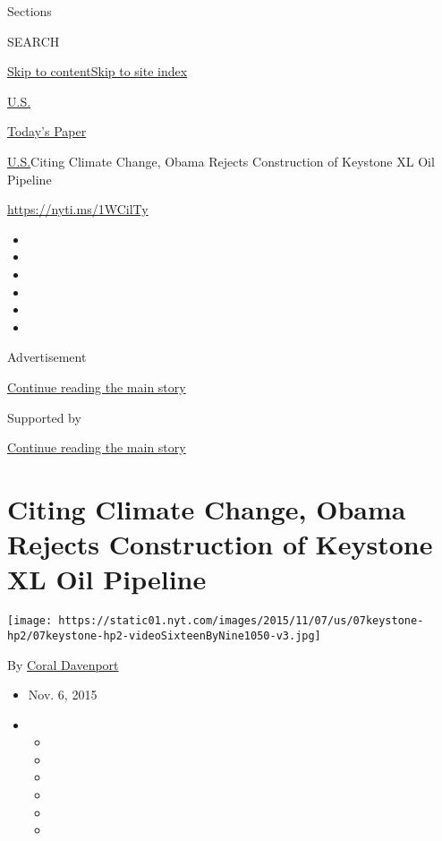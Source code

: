 Sections

SEARCH

\protect\hyperlink{site-content}{Skip to
content}\protect\hyperlink{site-index}{Skip to site index}

\href{https://www.nytimes.com/section/us}{U.S.}

\href{https://myaccount.nytimes.com/auth/login?response_type=cookie\&client_id=vi}{}

\href{https://www.nytimes.com/section/todayspaper}{Today's Paper}

\href{/section/us}{U.S.}\textbar{}Citing Climate Change, Obama Rejects
Construction of Keystone XL Oil Pipeline

\url{https://nyti.ms/1WCilTy}

\begin{itemize}
\item
\item
\item
\item
\item
\item
\end{itemize}

Advertisement

\protect\hyperlink{after-top}{Continue reading the main story}

Supported by

\protect\hyperlink{after-sponsor}{Continue reading the main story}

\hypertarget{citing-climate-change-obama-rejects-construction-of-keystone-xl-oil-pipeline}{%
\section{Citing Climate Change, Obama Rejects Construction of Keystone
XL Oil
Pipeline}\label{citing-climate-change-obama-rejects-construction-of-keystone-xl-oil-pipeline}}

\texttt{[image: https://static01.nyt.com/images/2015/11/07/us/07keystone-hp2/07keystone-hp2-videoSixteenByNine1050-v3.jpg]}

By \href{https://www.nytimes.com/by/coral-davenport}{Coral Davenport}

\begin{itemize}
\item
  Nov. 6, 2015
\item
  \begin{itemize}
  \item
  \item
  \item
  \item
  \item
  \item
  \end{itemize}
\end{itemize}


